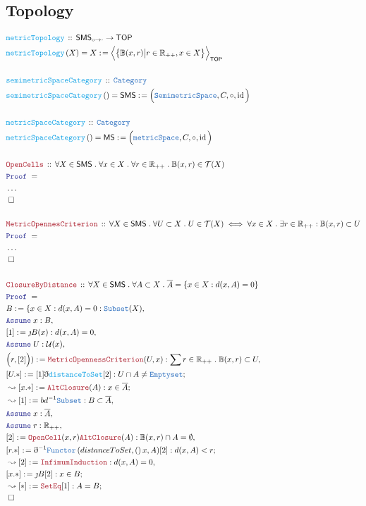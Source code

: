 \documentclass[12pt]{scrartcl}
\newcommand{\TYPE}[1]{\textcolor{NavyBlue}{\mathtt{#1}}}
\newcommand{\FUNC}[1]{\textcolor{Cerulean}{\mathtt{#1}}}
\newcommand{\LOGIC}[1]{\textcolor{Blue}{\mathtt{#1}}}
\newcommand{\THM}[1]{\textcolor{Maroon}{\mathtt{#1}}}
\renewcommand{\.}{\; . \;}
\newcommand{\de}{: \kern 0.1pc =}
\newcommand{\Act}[1]{\left( #1 \right)}
\newcommand{\Theorem}[2]{& \THM{#1} \, :: \, #2 \\ & \Proof = \\ }
\newcommand{\DeclareFunc}[2]{& \FUNC{#1} \, :: \, #2 \\}
\newcommand{\DefineNamedFunc}[4]{&  \FUNC{#1}\Act{#2} = #3 \de #4 \\}
\newcommand{\Page}[1]{ \begin{align*} #1 \end{align*}   }
\newcommand{ \bd }{ \ByDef }
\newcommand{\NoProof}{ & \ldots \\ \EndProof}
\newcommand{\Reals}{\mathbb{R} }
\DeclareMathOperator*{\id}{id}
\newcommand{\Cat}{\TYPE{Category}}
\newcommand{\Func}[2]{\TYPE{Functor}\left( #1, #2 \right)}
\newcommand{\Say}[3]{& #1 \de #2 : #3, \\}
\newcommand{\Conclude}[3]{& #1 \de #2 : #3; \\}
\newcommand{\Derive}[3]{& \leadsto #1 \de #2 : #3, \\}
\newcommand{\DeriveConclude}[3]{& \leadsto #1 \de #2 : #3 ; \\}
\newcommand{\Assume}[2]{& \LOGIC{Assume} \; #1 : #2, \\}
\newcommand{\QED}{\; \square}
\newcommand{\EndProof}{& \QED \\}
\newcommand{\ByDef}{\eth}
\newcommand{\ByConstr}{\jmath}
\newcommand{\Proof}{\LOGIC{Proof} \; }
\newcommand{\TOP}{\mathsf{TOP}}
\newcommand{\T}{\mathcal{T}}
\newcommand{\U}{\mathcal{U}}
\newcommand{\Semiiso}{\mathsf{SMS}_{\circ \to \cdot}}
\newcommand{\SMS}{\mathsf{SMS}}
\begin{document}
\subsection{Topology}
\Page{       
	\DeclareFunc{metricTopology}  
	{
		\Semiiso \to \TOP
	}
	\DefineNamedFunc{metricTopology}{X}{X}{\Big\langle \big\{  \mathbb{B}(x,r)  \big|  r \in \Reals_{++}, x \in X  \big\}   \Big\rangle_{\TOP}}
	\\
	\DeclareFunc{semimetricSpaceCategory}{\Cat}
	\DefineNamedFunc{semimetricSpaceCategory}{}{\mathsf{SMS}}{ \Big(  \TYPE{SemimetricSpace}, C, \circ, \id \Big)  }
	\\
	\DeclareFunc{metricSpaceCategory}{\Cat}
	\DefineNamedFunc{metricSpaceCategory}{}{\mathsf{MS}}{ \Big(  \TYPE{metricSpace}, C, \circ, \id \Big)  }
	\\
	\Theorem{OpenCells}{\forall X \in \SMS \. \forall x \in X \. \forall r \in \Reals_{++} \. \mathbb{B}(x,r) \in \T(X) }
	\NoProof
	\\
	\Theorem{MetricOpennesCriterion}{\forall X \in \SMS \. \forall U \subset X \. U \in \T(X) \iff \forall x \in X \. \exists r \in \Reals_{++} : \mathbb{B}(x,r) \subset U }
	\NoProof
	\\
	\Theorem{ClosureByDistance}{\forall X \in \SMS \. \forall A \subset X \. \overline{A} = \{  x \in X : d(x,A) = 0 \}}
	\Say{B}{ \{ x \in X : d(x,A) = 0}{\TYPE{Subset}(X)}
	\Assume{x}{B}
	\Say{[1]}{\ByConstr B (x)}{d(x,A) = 0}
	\Assume{U}{\U(x)}
	\Say{\Big(r,[2] \Big))}{\THM{MetricOpennessCriterion}(U,x)}{\sum r \in \Reals_{++} \. \mathbb{B}(x,r) \subset U}
	\Conclude{[U.*]}{[1]\bd \FUNC{distanceToSet}[2]}{U \cap A \neq \TYPE{Emptyset}}
	\DeriveConclude{[x.*]}{\THM{AltClosure}(A)}{ x \in \overline{A}}
	\Derive{[1]}{bd^{-1} \TYPE{Subset} }{B \subset \overline{A}}
	\Assume{x}{\overline{A}}
	\Assume{r}{\Reals_{++}}
	\Say{[2]}{\THM{OpenCell}(x,r)\THM{AltClosure}(A)}{\mathbb{B}(x,r) \cap A = \emptyset }
	\Conclude{[r.*]}{\bd^{-1} \Func{distanceToSet}(x,A)[2]}{ d(x,A) < r}
	\Derive{[2]}{\THM{InfimumInduction}}{ d(x,A) = 0}
	\Conclude{[x.*]}{\ByConstr B [2]}{x \in B}
	\DeriveConclude{[*]}{\THM{SetEq}[1]}{A = B}
	\EndProof
}
\end{document}
